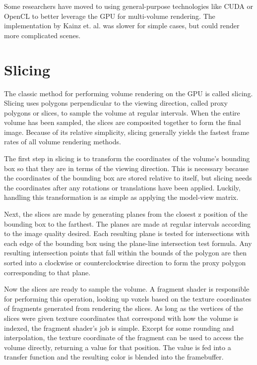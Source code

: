 \documentclass{report}
\begin{document}
Some researchers have moved to using general-purpose technologies like CUDA or
OpenCL to better leverage the GPU for multi-volume rendering.  The
implementation by Kainz et. al. \cite{Kainz09} was slower for simple cases, but could
render more complicated scenes.

\section{Slicing}

The classic method for performing volume rendering on the GPU is called slicing.
Slicing uses polygons perpendicular to the viewing direction, called proxy
polygons or slices, to sample the volume at regular intervals.  When the entire
volume has been sampled, the slices are composited together to form the final
image.  Because of its relative simplicity, slicing generally yields the fastest
frame rates of all volume rendering methods.

The first step in slicing is to transform the coordinates of the volume’s
bounding box so that they are in terms of the viewing direction.  This is
necessary because the coordinates of the bounding box are stored relative to
itself, but slicing needs the coordinates after any rotations or translations
have been applied.  Luckily, handling this transformation is as simple as
applying the model-view matrix.

Next, the slices are made by generating planes from the closest z position of
the bounding box to the farthest.  The planes are made at regular intervals
according to the image quality desired.  Each resulting plane is tested for
intersections with each edge of the bounding box using the plane-line
intersection test formula.  Any resulting intersection points that fall within
the bounds of the polygon are then sorted into a clockwise or counterclockwise
direction to form the proxy polygon corresponding to that plane.

Now the slices are ready to sample the volume.  A fragment shader is responsible
for performing this operation, looking up voxels based on the texture
coordinates of fragments generated from rendering the slices.  As long as the
vertices of the slices were given texture coordinates that correspond with how
the volume is indexed, the fragment shader’s job is simple.  Except for some
rounding and interpolation, the texture coordinate of the fragment can be used
to access the volume directly, returning a value for that position.  The value
is fed into a transfer function and the resulting color is blended into the
framebuffer.
\end{document}
